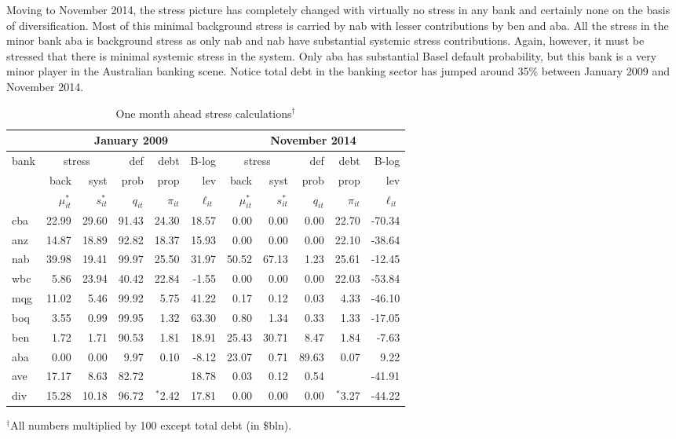\documentclass[authoryear]{elsarticle}
\begin{document}
 Moving to November 2014, the stress picture has completely changed with virtually no stress in any bank and certainly none on the basis of diversification.    Most of this minimal background stress is carried by nab with lesser contributions by ben and aba.    All the stress in the minor bank aba is background stress as only nab and nab have substantial systemic stress contributions.   Again, however, it must be stressed that there is minimal systemic stress in the system.    Only aba has substantial Basel default probability, but this bank is a very minor player in the Australian banking scene.   Notice total debt in the banking sector has jumped around 35\% between January 2009 and November 2014.




\begin{table}[ht]
\caption{One month ahead stress calculations$^\dag$ }\label{twodates}
\centering
\vspace{4mm}
\begin{tabular}{|l|rrrrr|rrrrr|}
\hline
&\multicolumn{5}{c|}{January 2009}&\multicolumn{5}{c|}{November 2014}\\
  \hline
bank & \multicolumn{2}{c}{stress} & def & debt & B-log& \multicolumn{2}{c}{stress} & def & debt & B-log \\
  \cline{2-3}\cline{7-8}
           & back & syst & prob & prop & lev& back & syst & prob & prop & lev \\
  \cline{2-11} 
            & $\mu^*_{it}$  & $s^*_{it}$ & $q_{it}$ & $\pi_{it}$ & $\ell_{it}$
        & $\mu^*_{it}$  & $s^*_{it}$ & $q_{it}$ & $\pi_{it}$ & $\ell_{it}$ 
        \\
  \hline
cba & 22.99 & 29.60 & 91.43 & 24.30 & 18.57 & 0.00 & 0.00 & 0.00 & 22.70 & -70.34 \\ 
anz & 14.87 & 18.89 & 92.82 & 18.37 & 15.93 & 0.00 & 0.00 & 0.00 & 22.10 & -38.64 \\ 
nab & 39.98 & 19.41 & 99.97 & 25.50 & 31.97 & 50.52 & 67.13 & 1.23 & 25.61 & -12.45 \\ 
wbc & 5.86 & 23.94 & 40.42 & 22.84 & -1.55 & 0.00 & 0.00 & 0.00 & 22.03 & -53.84 \\ 
mqg & 11.02 & 5.46 & 99.92 & 5.75 & 41.22 & 0.17 & 0.12 & 0.03 & 4.33 & -46.10 \\ 
boq & 3.55 & 0.99 & 99.95 & 1.32 & 63.30 & 0.80 & 1.34 & 0.33 & 1.33 & -17.05 \\ 
ben & 1.72 & 1.71 & 90.53 & 1.81 & 18.91 & 25.43 & 30.71 & 8.47 & 1.84 & -7.63 \\ 
aba & 0.00 & 0.00 & 9.97 & 0.10 & -8.12 & 23.07 & 0.71 & 89.63 & 0.07 & 9.22 \\ 
  \hline
ave & 17.17 & 8.63 & 82.72 &  & 18.78 & 0.03 & 0.12 & 0.54 &  & -41.91 \\ 
div & 15.28 & 10.18 & 96.72 & $^*$2.42 & 17.81 & 0.00 & 0.00 & 0.00 & $^*$3.27 & -44.22 \\ 
   \hline
\end{tabular}
\end{table}
\small{   $^\dag$All numbers multiplied by 100 except total debt (in \$bln).}
\end{document}
